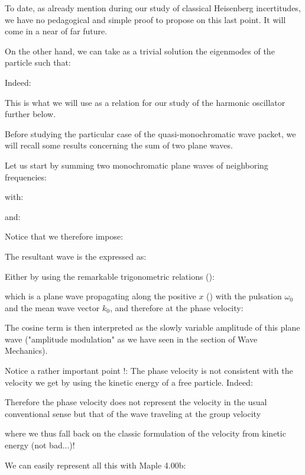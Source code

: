 	To date, as already mention during our study of classical Heisenberg incertitudes, we have no pedagogical and simple proof to propose on this last point. It will come in a near of far future.

	On the other hand, we can take as a trivial solution the eigenmodes of the particle such that:
	
	Indeed:
	
	This is what we will use as a relation for our study of the harmonic oscillator further below.

	Before studying the particular case of the quasi-monochromatic wave packet, we will recall some results concerning the sum of two plane waves.

	Let us start by summing two monochromatic plane waves of neighboring frequencies:
	
	with:
	
	and:
	
	Notice that we therefore impose:
	
	The resultant wave is the expressed as:
	
	Either by using the remarkable trigonometric relations ():
	
	which is a plane wave propagating along the positive $x$ () with the pulsation $\omega_0$ and the mean wave vector $k_0$, and therefore at the phase velocity:
	
	The cosine term is then interpreted as the slowly variable amplitude of this plane wave ("amplitude modulation" as we have seen in the section of Wave Mechanics).

	Notice a rather important point !: The phase velocity is not consistent with the velocity we get by using the kinetic energy of a free particle. Indeed:
	
	Therefore the phase velocity does not represent the velocity in the usual conventional sense but that of the wave traveling at the group velocity\label{wave velocity group traveling wave}
	
	where we thus fall back on the classic formulation of the velocity from kinetic energy (not bad...)!

	We can easily represent all this with Maple 4.00b:
	

